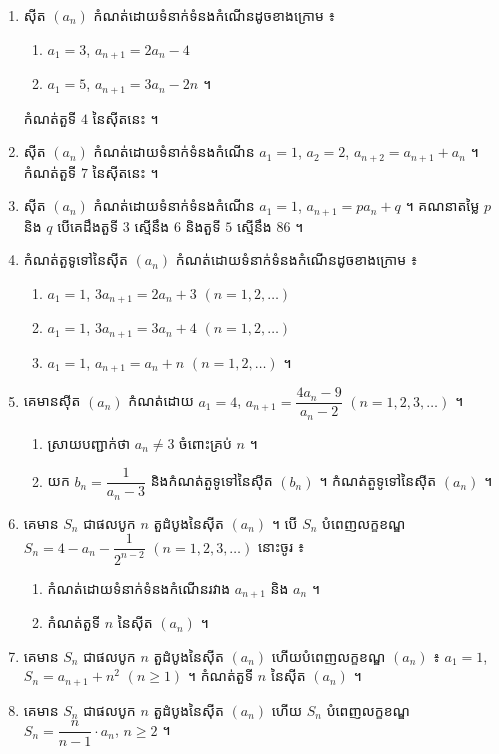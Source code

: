 \begin{enumerate}[1]
  \item ស៊ីត $(a_n)$ កំណត់ដោយទំនាក់ទំនងកំណើនដូចខាងក្រោម ៖
  \begin{enumerate}[a]
    \item $a_1 = 3$, $a_{n+1} = 2a_n - 4$
    \item $a_1 = 5$, $a_{n+1} = 3a_n - 2n$ ។
  \end{enumerate}
  កំណត់តួទី $4$ នៃស៊ីតនេះ ។
  \item ស៊ីត $(a_n)$ កំណត់ដោយទំនាក់ទំនងកំណើន $a_1 = 1$, $a_2 = 2$, $a_{n+2} = a_{n+1} + a_n$ ។ កំណត់តួទី $7$ នៃស៊ីតនេះ ។
  \item ស៊ីត $(a_n)$ កំណត់ដោយទំនាក់ទំនងកំណើន $a_1 = 1$, $a_{n+1} = pa_n + q$ ។ គណនាតម្លៃ $p$ និង $q$ បើគេដឹងតួទី $3$ ស្មើនឹង $6$ និងតួទី $5$ ស្មើនឹង $86$ ។
  \item កំណត់តួទូទៅនៃស៊ីត $(a_n)$ កំណត់ដោយទំនាក់ទំនងកំណើនដូចខាងក្រោម ៖
  \begin{enumerate}[a]
    \item $a_1 = 1$, $3a_{n+1} = 2a_n + 3$ \quad $(n = 1, 2, \ldots)$
    \item $a_1 = 1$, $3a_{n+1} = 3a_n + 4$ \quad $(n = 1, 2, \ldots)$
    \item $a_1 = 1$, $a_{n+1} = a_n + n$ \quad $(n = 1, 2, \ldots)$ ។
  \end{enumerate}
  \item គេមានស៊ីត $(a_n)$ កំណត់ដោយ $a_1 = 4$, $a_{n+1} = \dfrac{4a_n - 9}{a_n - 2}$ $(n = 1, 2, 3, \ldots)$ ។
  \begin{enumerate}[a]
    \item ស្រាយបញ្ជាក់ថា $a_n \ne 3$ ចំពោះគ្រប់ $n$ ។
    \item យក $b_n = \dfrac{1}{a_n - 3}$ និងកំណត់តួទូទៅនៃស៊ីត $(b_n)$ ។ កំណត់តួទូទៅនៃស៊ីត $(a_n)$ ។
  \end{enumerate}
  \item គេមាន $S_n$ ជាផលបូក $n$ តួដំបូងនៃស៊ីត $(a_n)$ ។ បើ $S_n$ បំពេញលក្ខខណ្ឌ $S_n = 4 - a_n - \dfrac{1}{2^{n-2}}$ $(n = 1, 2, 3, \ldots)$ នោះចូរ ៖
  \begin{enumerate}[a]
    \item កំណត់ដោយទំនាក់ទំនងកំណើនរវាង $a_{n+1}$ និង $a_n$ ។
    \item កំណត់តួទី $n$ នៃស៊ីត $(a_n)$ ។
  \end{enumerate}
  \item គេមាន $S_n$ ជាផលបូក $n$ តួដំបូងនៃស៊ីត $(a_n)$ ហើយបំពេញលក្ខខណ្ឌ $(a_n)$ ៖ $a_1 = 1$, $S_n = a_{n+1} + n^2$ $(n \ge 1)$ ។ កំណត់តួទី $n$ នៃស៊ីត $(a_n)$ ។
  \item គេមាន $S_n$ ជាផលបូក $n$ តួដំបូងនៃស៊ីត $(a_n)$ ហើយ $S_n$ បំពេញលក្ខខណ្ឌ $S_n = \dfrac{n}{n-1} \cdot a_n$, $n \ge 2$ ។

\end{enumerate}
